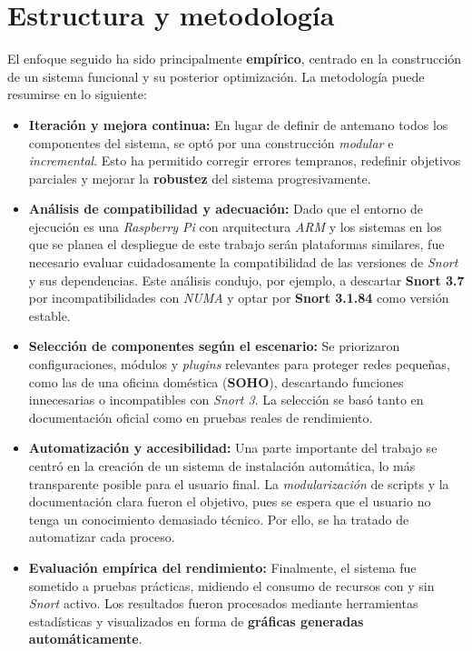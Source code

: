 \documentclass[11pt,a4paper,twoside]{report}
\begin{document}
\chapter{Estructura y metodología}

El enfoque seguido ha sido principalmente \textbf{empírico}, centrado en la construcción de un sistema funcional y su posterior optimización. La metodología puede resumirse en lo siguiente:

\begin{itemize}
	\item \textbf{Iteración y mejora continua:} En lugar de definir de antemano todos los componentes del sistema, se optó por una construcción \textit{modular} e \textit{incremental}. Esto ha permitido corregir errores tempranos, redefinir objetivos parciales y mejorar la \textbf{robustez} del sistema progresivamente.
	
	\item \textbf{Análisis de compatibilidad y adecuación:} Dado que el entorno de ejecución es una \textit{Raspberry Pi} con arquitectura \textit{ARM} y los sistemas en los que se planea el despliegue de este trabajo serán plataformas similares, fue necesario evaluar cuidadosamente la compatibilidad de las versiones de \textit{Snort} y sus dependencias. Este análisis condujo, por ejemplo, a descartar \textbf{Snort 3.7} por incompatibilidades con \textit{NUMA} y optar por \textbf{Snort 3.1.84} como versión estable.
	
	\item \textbf{Selección de componentes según el escenario:} Se priorizaron configuraciones, módulos y \textit{plugins} relevantes para proteger redes pequeñas, como las de una oficina doméstica (\textbf{SOHO}), descartando funciones innecesarias o incompatibles con \textit{Snort 3}. La selección se basó tanto en documentación oficial como en pruebas reales de rendimiento.
	
	\item \textbf{Automatización y accesibilidad:} Una parte importante del trabajo se centró en la creación de un sistema de instalación automática, lo más transparente posible para el usuario final. La \textit{modularización} de scripts y la documentación clara fueron el objetivo, pues se espera que el usuario no tenga un conocimiento demasiado técnico. Por ello, se ha tratado de automatizar cada proceso.
	
	\item \textbf{Evaluación empírica del rendimiento:} Finalmente, el sistema fue sometido a pruebas prácticas, midiendo el consumo de recursos con y sin \textit{Snort} activo. Los resultados fueron procesados mediante herramientas estadísticas y visualizados en forma de \textbf{gráficas generadas automáticamente}.
\end{itemize}
\end{document}

